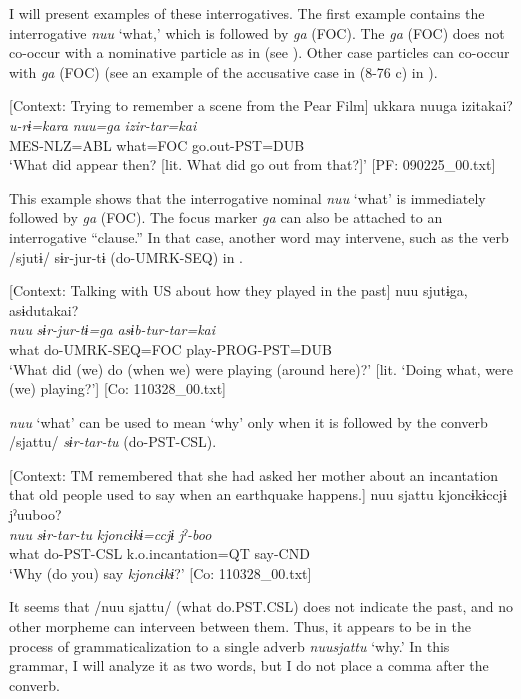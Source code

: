   I will present examples of these interrogatives. The first example contains the interrogative \textit{nuu} ‘what,’ which is followed by \textit{ga} (FOC). The \textit{ga} (FOC) does not co-occur with a nominative particle as in  (see ). Other case particles can co-occur with \textit{ga} (FOC) (see an example of the accusative case in (8-76 c) in ).

\ea \label{ex:5:31}   [Context: Trying to remember a scene from the Pear Film]
\glll  ukkara  nuuga  izitakai?\\
\textit{u-rɨ=kara}  \textit{nuu=ga}  \textit{izir-tar=kai}\\
MES-NLZ=ABL  what=FOC  go.out-PST=DUB\\
\glt ‘What did appear then? [lit. What did go out from that?]’ [PF: 090225\_00.txt]
\z

This example shows that the interrogative nominal \textit{nuu} ‘what’ is immediately followed by \textit{ga} (FOC). The focus marker \textit{ga} can also be attached to an interrogative “clause.” In that case, another word may intervene, such as the verb /sjutɨ/ sɨr-jur-tɨ (do-UMRK-SEQ) in .

\ea \label{ex:5:32}   [Context: Talking with US about how they played in the past]
\glll  nuu  sjutɨga,  asɨdutakai?\\
\textit{nuu}  \textit{sɨr-jur-tɨ=ga}  \textit{asɨb-tur-tar=kai}\\
what  do-UMRK-SEQ=FOC  play-PROG-PST=DUB\\
\glt ‘What did (we) do (when we) were playing (around here)?’ [lit. ‘Doing what, were (we) playing?’] [Co: 110328\_00.txt]
\z

\textit{nuu} ‘what’ can be used to mean ‘why’ only when it is followed by the converb /sjattu/ \textit{sɨr-tar-tu} (do-PST-CSL).

\ea \label{ex:5:33}   [Context: TM remembered that she had asked her mother about an incantation that old people used to say when an earthquake happens.]
\glll  nuu  sjattu  {\textbar}kjoncɨkɨ{\textbar}ccjɨ  jˀuuboo?\\
\textit{nuu}  \textit{sɨr-tar-tu}  \textit{kjoncɨkɨ=ccjɨ}  \textit{jˀ-boo}\\
what  do-PST-CSL  k.o.incantation=QT  say-CND\\
\glt ‘Why (do you) say \textit{kjoncɨkɨ}?’ [Co: 110328\_00.txt]
\z

It seems that /nuu sjattu/ (what do.PST.CSL) does not indicate the past, and no other morpheme can interveen between them. Thus, it appears to be in the process of grammaticalization to a single adverb \textit{nuusjattu} ‘why.’ In this grammar, I will analyze it as two words, but I do not place a comma after the converb.

